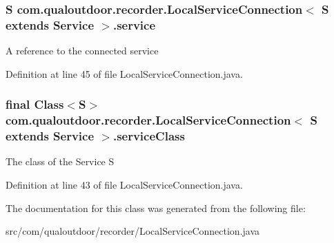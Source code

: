 \hypertarget{classcom_1_1qualoutdoor_1_1recorder_1_1LocalServiceConnection_3_01S_01extends_01Service_01_4_a499f27a81f1d6ca28fe96efd7a390694}{
\subsubsection[{service}]{\setlength{\rightskip}{0pt plus 5cm}S com.\-qualoutdoor.\-recorder.\-Local\-Service\-Connection$<$ S extends Service $>$.service\hspace{0.3cm}{\ttfamily [private]}}}\label{classcom_1_1qualoutdoor_1_1recorder_1_1LocalServiceConnection_3_01S_01extends_01Service_01_4_a499f27a81f1d6ca28fe96efd7a390694}
A reference to the connected service 

Definition at line 45 of file Local\-Service\-Connection.\-java.

\hypertarget{classcom_1_1qualoutdoor_1_1recorder_1_1LocalServiceConnection_3_01S_01extends_01Service_01_4_ad5a12d0cd17c4b6335e1a79958132b14}{
\subsubsection[{service\-Class}]{\setlength{\rightskip}{0pt plus 5cm}final Class$<$S$>$ com.\-qualoutdoor.\-recorder.\-Local\-Service\-Connection$<$ S extends Service $>$.service\-Class\hspace{0.3cm}{\ttfamily [private]}}}\label{classcom_1_1qualoutdoor_1_1recorder_1_1LocalServiceConnection_3_01S_01extends_01Service_01_4_ad5a12d0cd17c4b6335e1a79958132b14}
The class of the Service S 

Definition at line 43 of file Local\-Service\-Connection.\-java.



The documentation for this class was generated from the following file\-:\begin{DoxyCompactItemize}
\item 
src/com/qualoutdoor/recorder/Local\-Service\-Connection.\-java\end{DoxyCompactItemize}
